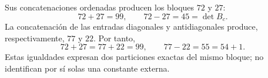 Sus concatenaciones ordenadas producen los bloques \(72\) y \(27\):
\[
72+27=99,
\qquad
72-27=45=\det B_c.
\]
La concatenación de las entradas diagonales y antidiagonales produce,
respectivamente, \(77\) y \(22\). Por tanto,
\[
72+27=77+22=99,
\qquad
77-22=55=54+1.
\]
Estas igualdades expresan dos particiones exactas del mismo bloque; no
identifican por sí solas una constante externa.
